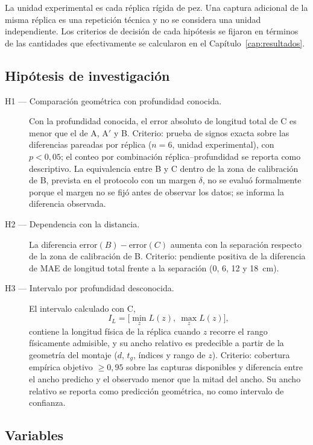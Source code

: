 \documentclass{report}
\newcommand{\Aprime}{A$'$}
\newcommand{\IL}{I_L}
\begin{document}
La unidad experimental es cada réplica rígida de pez. Una captura adicional de la misma réplica es una repetición técnica y no se considera una unidad independiente. Los criterios de decisión de cada hipótesis se fijaron en términos de las cantidades que efectivamente se calcularon en el Capítulo~\ref{cap:resultados}.

\subsection{Hipótesis de investigación}

\begin{description}
  \item[H1 --- Comparación geométrica con profundidad conocida.] Con la profundidad conocida, el error absoluto de longitud total de C es menor que el de A, \Aprime{} y B. Criterio: prueba de signos exacta sobre las diferencias pareadas por réplica ($n = 6$, unidad experimental), con $p < 0{,}05$; el conteo por combinación réplica--profundidad se reporta como descriptivo. La equivalencia entre B y C dentro de la zona de calibración de B, prevista en el protocolo con un margen $\delta$, no se evaluó formalmente porque el margen no se fijó antes de observar los datos; se informa la diferencia observada.
  \item[H2 --- Dependencia con la distancia.] La diferencia $\mathrm{error}(B) - \mathrm{error}(C)$ aumenta con la separación respecto de la zona de calibración de B. Criterio: pendiente positiva de la diferencia de MAE de longitud total frente a la separación (0, 6, 12 y 18~cm).
  \item[H3 --- Intervalo por profundidad desconocida.] El intervalo calculado con C,
  \begin{equation*}
    \IL = \Big[\min_{z} L(z),\ \max_{z} L(z)\Big],
  \end{equation*}
  contiene la longitud física de la réplica cuando $z$ recorre el rango físicamente admisible, y su ancho relativo es predecible a partir de la geometría del montaje ($d$, $t_g$, índices y rango de $z$). Criterio: cobertura empírica objetivo $\geq 0{,}95$ sobre las capturas disponibles y diferencia entre el ancho predicho y el observado menor que la mitad del ancho. Su ancho relativo se reporta como predicción geométrica, no como intervalo de confianza.
\end{description}

\subsection{Variables}
\end{document}
